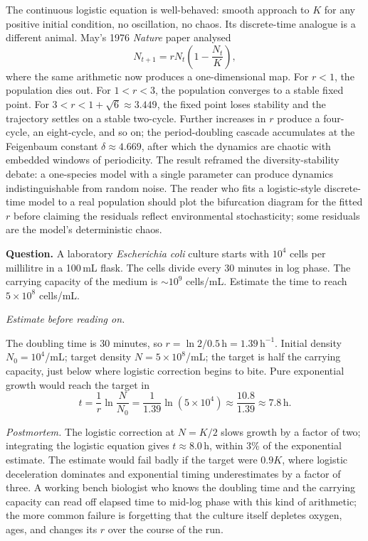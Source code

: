 \begin{mastery}
The continuous logistic equation is well-behaved: smooth approach
to $K$ for any positive initial condition, no oscillation, no
chaos. Its discrete-time analogue is a different animal. May's
1976 \emph{Nature} paper \cite[pp.~459--467]{paper:v6c08-may-1976-chaos}
analysed
\[
N_{t+1} = r N_t \left(1 - \frac{N_t}{K}\right),
\]
where the same arithmetic now produces a one-dimensional map. For
$r < 1$, the population dies out. For $1 < r < 3$, the
population converges to a stable fixed point. For $3 < r < 1 +
\sqrt{6} \approx 3.449$, the fixed point loses stability and the
trajectory settles on a stable two-cycle. Further increases in $r$
produce a four-cycle, an eight-cycle, and so on; the period-doubling
cascade accumulates at the Feigenbaum constant
$\delta \approx 4.669$, after which the dynamics are chaotic with
embedded windows of periodicity. The result reframed the
diversity-stability debate: a one-species model with a single
parameter can produce dynamics indistinguishable from random noise.
The reader who fits a logistic-style discrete-time model to a real
population should plot the bifurcation diagram for the fitted $r$
before claiming the residuals reflect environmental stochasticity;
some residuals are the model's deterministic chaos.
\end{mastery}

\begin{estimation}
\textbf{Question.} A laboratory \emph{Escherichia coli} culture starts
with $10^4$ cells per millilitre in a 100\,mL flask. The cells divide
every 30 minutes in log phase. The carrying capacity of the medium is
$\sim 10^9$ cells/mL. Estimate the time to reach $5 \times 10^8$
cells/mL.

\smallskip
\textit{Estimate before reading on.}

\smallskip
The doubling time is 30 minutes, so $r = \ln 2 / 0.5\,\text{h} =
1.39\,\text{h}^{-1}$. Initial density $N_0 = 10^4$/mL; target density
$N = 5 \times 10^8$/mL; the target is half the carrying capacity,
just below where logistic correction begins to bite. Pure
exponential growth would reach the target in
\[
t = \frac{1}{r} \ln \frac{N}{N_0} = \frac{1}{1.39} \ln (5 \times 10^4)
\approx \frac{10.8}{1.39} \approx 7.8\,\text{h}.
\]

\smallskip
\textit{Postmortem.} The logistic correction at $N = K/2$ slows
growth by a factor of two; integrating the logistic equation gives
$t \approx 8.0\,\text{h}$, within 3\% of the exponential estimate.
The estimate would fail badly if the target were $0.9 K$, where
logistic deceleration dominates and exponential timing
underestimates by a factor of three. A working bench biologist who
knows the doubling time and the carrying capacity can read off
elapsed time to mid-log phase with this kind of arithmetic; the more
common failure is forgetting that the culture itself depletes oxygen,
ages, and changes its $r$ over the course of the run.
\end{estimation}

